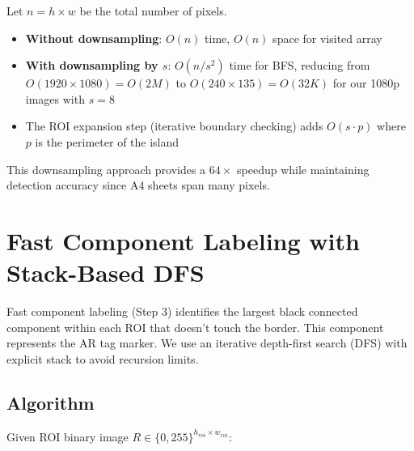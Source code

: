 \documentclass[9pt,a4paper,twocolumn,twoside]{tau-class/tau}
\begin{document}
    Let $n = h \times w$ be the total number of pixels.
    \begin{itemize}
        \item \textbf{Without downsampling}: $O(n)$ time, $O(n)$ space for visited array
        \item \textbf{With downsampling by $s$}: $O(n/s^2)$ time for BFS, reducing from $O(1920 \times 1080) = O(2M)$ to $O(240 \times 135) = O(32K)$ for our 1080p images with $s=8$
        \item The ROI expansion step (iterative boundary checking) adds $O(s \cdot p)$ where $p$ is the perimeter of the island
    \end{itemize}

    This downsampling approach provides a $64\times$ speedup while maintaining detection accuracy since A4 sheets span many pixels.

\section{Fast Component Labeling with Stack-Based DFS}

    Fast component labeling (Step 3) identifies the largest black connected component within each ROI that doesn't touch the border. This component represents the AR tag marker. We use an iterative depth-first search (DFS) with explicit stack to avoid recursion limits.

    \subsection{Algorithm}

    Given ROI binary image $R \in \{0, 255\}^{h_{roi} \times w_{roi}}$:
\end{document}
